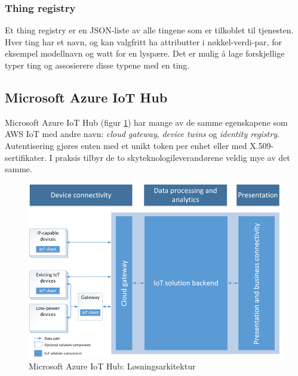 \subsubsection{Thing registry}
Et thing registry er en JSON-liste av alle tingene som er tilkoblet til tjenesten. Hver ting
har et navn, og kan valgfritt ha attributter i nøkkel-verdi-par, for eksempel modellnavn og watt
for en lyspære. Det er mulig å lage forskjellige typer ting og assosierere disse typene med en ting.

\subsection{Microsoft Azure IoT Hub}
Microsoft Azure IoT Hub (figur \ref{fig:azure_iot}) har mange av de samme egenskapene som AWS IoT med andre navn: \textit{cloud gateway},
\textit{device twins} og \textit{identity registry}. Autentisering gjøres enten med et unikt token per enhet eller med
X.509-sertifikater. I praksis tilbyr de to skyteknologileverandørene veldig mye av det samme.

\begin{figure}
\includegraphics[width=1.0\textwidth,center]{fig/iot-reference-architecture}
\caption{Microsoft Azure IoT Hub: Løsningsarkitektur} %
\label{fig:azure_iot}
\end{figure}


